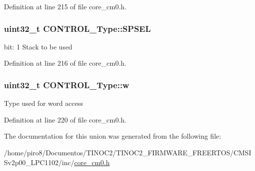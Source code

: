 Definition at line 215 of file core\+\_\+cm0.\+h.

\subsubsection[{\texorpdfstring{S\+P\+S\+EL}{SPSEL}}]{\setlength{\rightskip}{0pt plus 5cm}uint32\+\_\+t C\+O\+N\+T\+R\+O\+L\+\_\+\+Type\+::\+S\+P\+S\+EL}\hypertarget{union_c_o_n_t_r_o_l___type_a8cc085fea1c50a8bd9adea63931ee8e2}{}\label{union_c_o_n_t_r_o_l___type_a8cc085fea1c50a8bd9adea63931ee8e2}
bit\+: 1 Stack to be used 

Definition at line 216 of file core\+\_\+cm0.\+h.

\subsubsection[{\texorpdfstring{w}{w}}]{\setlength{\rightskip}{0pt plus 5cm}uint32\+\_\+t C\+O\+N\+T\+R\+O\+L\+\_\+\+Type\+::w}\hypertarget{union_c_o_n_t_r_o_l___type_a6b642cca3d96da660b1198c133ca2a1f}{}\label{union_c_o_n_t_r_o_l___type_a6b642cca3d96da660b1198c133ca2a1f}
Type used for word access 

Definition at line 220 of file core\+\_\+cm0.\+h.



The documentation for this union was generated from the following file\+:\begin{DoxyCompactItemize}
\item 
/home/piro8/\+Documentos/\+T\+I\+N\+O\+C2/\+T\+I\+N\+O\+C2\+\_\+\+F\+I\+R\+M\+W\+A\+R\+E\+\_\+\+F\+R\+E\+E\+R\+T\+O\+S/\+C\+M\+S\+I\+Sv2p00\+\_\+\+L\+P\+C1102/inc/\hyperlink{core__cm0_8h}{core\+\_\+cm0.\+h}\end{DoxyCompactItemize}
